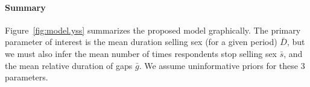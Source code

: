 \paragraph{Summary}
Figure~\ref{fig:model.yss} summarizes the proposed model graphically.
The primary parameter of interest is
the mean duration selling sex (for a given period) $\bar{D}$,
but we must also infer
the mean number of times respondents stop selling sex $\bar{s}$, and
the mean relative duration of gaps $\bar{g}$.
We assume uninformative priors for these 3 parameters.
